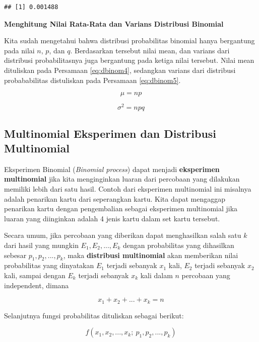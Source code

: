 \documentclass[]{book}
\begin{document}
\begin{verbatim}
## [1] 0.001488
\end{verbatim}

\textbf{Menghitung Nilai Rata-Rata dan Varians Distribusi Binomial}

Kita sudah mengetahui bahwa distribusi probabilitas binomial hanya
bergantung pada nilai \(n\), \(p\), dan \(q\). Berdasarkan tersebut
nilai mean, dan varians dari distribusi probabilitasnya juga bergantung
pada ketiga nilai tersebut. Nilai mean dituliskan pada Persamaan
\eqref{eq:dbinom4}, sedangkan varians dari distribusi probababilitas
distuliskan pada Persamaan \eqref{eq:dbinom5}.

\begin{equation}
   \mu=np
  \label{eq:dbinom4}
\end{equation}

\begin{equation}
   \sigma^2=npq
  \label{eq:dbinom5}
\end{equation}

\subsection{Multinomial Eksperimen dan Distribusi
Multinomial}\label{multinomial-eksperimen-dan-distribusi-multinomial}

Eksperimen Binomial (\emph{Binomial process}) dapat menjadi
\textbf{eksperimen multinomial} jika kita menginginkan luaran dari
percobaan yang dilakukan memiliki lebih dari satu hasil. Contoh dari
eksperimen multinomial ini misalnya adalah penarikan kartu dari
seperangkan kartu. Kita dapat mengaggap penarikan kartu dengan
pengembalian sebagai eksperimen multinomial jika luaran yang diinginkan
adalah 4 jenis kartu dalam set kartu tersebut.

Secara umum, jika percobaan yang diberikan dapat menghasilkan salah satu
\(k\) dari hasil yang mungkin \(E_1,E_2,...,E_k\) dengan probabilitas
yang dihasilkan sebesar \(p_1,p_2,...,p_k\), maka \textbf{distribusi
multinomial} akan memberikan nilai probabilitas yang dinyatakan \(E_1\)
terjadi sebanyak \(x_1\) kali, \(E_2\) terjadi sebanyak \(x_2\) kali,
sampai dengan \(E_k\) terjadi sebanyak \(x_k\) kali dalam \(n\)
percobaan yang independent, dimana

\[
x_1+x_2+...+x_k=n
\]

Selanjutnya fungsi probabilitas dituliskan sebagai berikut:

\[
f\left(x_1,x_2,...,x_k;\ p_1,p_2,...,p_k\right)
\]
\end{document}
